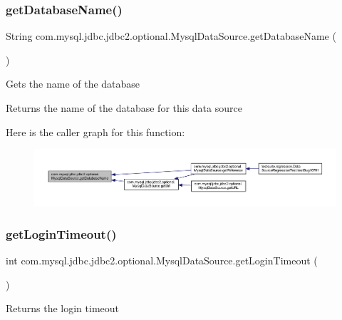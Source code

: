 \subsubsection{\texorpdfstring{get\+Database\+Name()}{getDatabaseName()}}
{\footnotesize\ttfamily String com.\+mysql.\+jdbc.\+jdbc2.\+optional.\+Mysql\+Data\+Source.\+get\+Database\+Name (\begin{DoxyParamCaption}{ }\end{DoxyParamCaption})}

Gets the name of the database

\begin{DoxyReturn}{Returns}
the name of the database for this data source 
\end{DoxyReturn}
Here is the caller graph for this function\+:
\nopagebreak
\begin{figure}[H]
\begin{center}
\leavevmode
\includegraphics[width=350pt]{classcom_1_1mysql_1_1jdbc_1_1jdbc2_1_1optional_1_1_mysql_data_source_acecf1a115893800067efed693bc8ec15_icgraph}
\end{center}
\end{figure}
\mbox{\label{classcom_1_1mysql_1_1jdbc_1_1jdbc2_1_1optional_1_1_mysql_data_source_a4613f6519c3c71b1b7cd4950399b8cdd}} 
\subsubsection{\texorpdfstring{get\+Login\+Timeout()}{getLoginTimeout()}}
{\footnotesize\ttfamily int com.\+mysql.\+jdbc.\+jdbc2.\+optional.\+Mysql\+Data\+Source.\+get\+Login\+Timeout (\begin{DoxyParamCaption}{ }\end{DoxyParamCaption})}

Returns the login timeout


